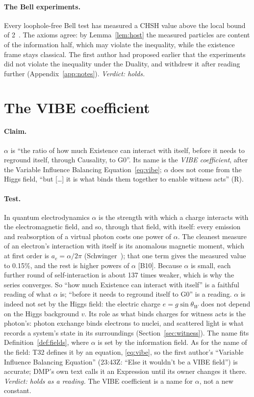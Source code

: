 \documentclass[11pt,a4paper]{article}
\theoremstyle{definition}
\newcommand{\chk}[1]{\textsf{[#1]}}
\newcommand{\tagR}{\textsf{(R)}}
\begin{document}
\paragraph{The Bell experiments.} Every loophole-free Bell test has measured a CHSH value above the local bound of
2~\cite{hensen,rosenfeld,storz}. The axioms agree: by Lemma~\ref{lem:host} the measured particles are content of the information half,
which may violate the inequality, while the existence frame stays classical. The first author had proposed earlier that the experiments did
not violate the inequality under the Duality, and withdrew it after reading further (Appendix~\ref{app:notes}). \emph{Verdict: holds.}

\section{The VIBE coefficient}\label{sec:vibe}

\paragraph{Claim.} $\alpha$ is ``the ratio of how much Existence can interact with itself, before it needs to reground itself, through
Causality, to G0''. Its name is the \emph{VIBE coefficient}, after the Variable Influence Balancing Equation~\eqref{eq:vibe}; $\alpha$ does
not come from the Higgs field, ``but [\dots] it is what binds them together to enable witness acts'' \tagR.

\paragraph{Test.} In quantum electrodynamics $\alpha$ is the strength with which a charge interacts with the electromagnetic field, and so,
through that field, with itself: every emission and reabsorption of a virtual photon costs one power of $\alpha$. The cleanest measure of an
electron's interaction with itself is its anomalous magnetic moment, which at first order is $a_e=\alpha/2\pi$ (Schwinger~\cite{schwinger});
that one term gives the measured value~\cite{fan} to 0.15\%, and the rest is higher powers of $\alpha$ \chk{B10}. Because $\alpha$ is small,
each further round of self-interaction is about 137 times weaker, which is why the series converges. So ``how much Existence can interact
with itself'' is a faithful reading of what $\alpha$ is; ``before it needs to reground itself to G0'' is a reading. $\alpha$ is indeed not
set by the Higgs field: the electric charge $e=g\sin\theta_W$ does not depend on the Higgs background $v$. Its role as what binds charges for
witness acts is the photon's: photon exchange binds electrons to nuclei, and scattered light is what records a system's state in its
surroundings (Section~\ref{sec:witness}). The name fits Definition~\ref{def:fields}, where $\alpha$ is set by the information field. As
for the name of the field: T32 defines it by an equation, \eqref{eq:vibe}, so the first author's ``Variable Influence Balancing
Equation'' (23:43Z: ``Else it wouldn't be a VIBE field'') is accurate; DMP's own text calls it an Expression until its owner changes it
there. \emph{Verdict: holds as a reading.} The VIBE coefficient is a name for $\alpha$, not a new
constant.
\end{document}
